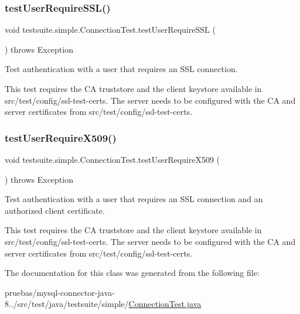 \mbox{\label{classtestsuite_1_1simple_1_1_connection_test_a0c148553019aa296f7f80dfc7edf1e49}} 
\subsubsection{\texorpdfstring{test\+User\+Require\+S\+S\+L()}{testUserRequireSSL()}}
{\footnotesize\ttfamily void testsuite.\+simple.\+Connection\+Test.\+test\+User\+Require\+S\+SL (\begin{DoxyParamCaption}{ }\end{DoxyParamCaption}) throws Exception}

Test authentication with a user that requires an S\+SL connection.

This test requires the CA truststore and the client keystore available in src/test/config/ssl-\/test-\/certs. The server needs to be configured with the CA and server certificates from src/test/config/ssl-\/test-\/certs. \mbox{\label{classtestsuite_1_1simple_1_1_connection_test_a8ccc3af85ebbc2d7b461b32b29d8982c}} 
\subsubsection{\texorpdfstring{test\+User\+Require\+X509()}{testUserRequireX509()}}
{\footnotesize\ttfamily void testsuite.\+simple.\+Connection\+Test.\+test\+User\+Require\+X509 (\begin{DoxyParamCaption}{ }\end{DoxyParamCaption}) throws Exception}

Test authentication with a user that requires an S\+SL connection and an authorized client certificate.

This test requires the CA truststore and the client keystore available in src/test/config/ssl-\/test-\/certs. The server needs to be configured with the CA and server certificates from src/test/config/ssl-\/test-\/certs. 

The documentation for this class was generated from the following file\+:\begin{DoxyCompactItemize}
\item 
pruebas/mysql-\/connector-\/java-\/8../src/test/java/testsuite/simple/\mbox{\hyperlink{_connection_test_8java}{Connection\+Test.\+java}}\end{DoxyCompactItemize}
